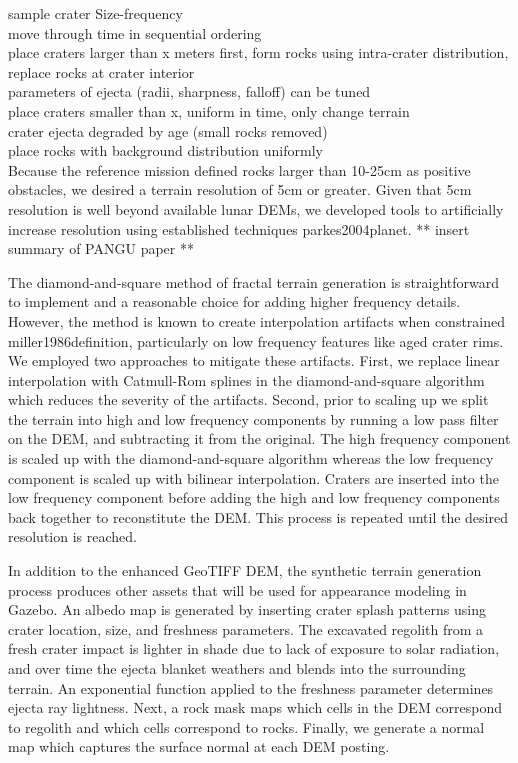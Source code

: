 \documentclass[twocolumn,letterpaper]{IEEEAerospaceCLS}  %
\begin{document}
sample crater Size-frequency \\
move through time in sequential ordering \\
place craters larger than x meters first, form rocks using intra-crater distribution, replace rocks at crater interior \\
parameters of ejecta (radii, sharpness, falloff) can be tuned \\
place craters smaller than x, uniform in time, only change terrain \\
crater ejecta degraded by age (small rocks removed) \\
place rocks with background distribution uniformly \\

Because the reference mission defined rocks larger than 10-25cm as positive obstacles, we desired a terrain resolution of 5cm or greater. Given that 5cm resolution is well beyond available lunar DEMs, we developed tools to artificially increase resolution using established techniques {parkes2004planet}. ** insert summary of PANGU paper **

The diamond-and-square method of fractal terrain generation is straightforward to implement and a reasonable choice for adding higher frequency details. However, the method is known to create interpolation artifacts when constrained {miller1986definition}, particularly on low frequency features like aged crater rims. We employed two approaches to mitigate these artifacts. First, we replace linear interpolation with Catmull-Rom splines in the diamond-and-square algorithm which reduces the severity of the artifacts. Second, prior to scaling up we split the terrain into high and low frequency components by running a low pass filter on the DEM, and subtracting it from the original. The high frequency component is scaled up with the diamond-and-square algorithm whereas the low frequency component is scaled up with bilinear interpolation. Craters are inserted into the low frequency component before adding the high and low frequency components back together to reconstitute the DEM. This process is repeated until the desired resolution is reached. 

In addition to the enhanced GeoTIFF DEM, the synthetic terrain generation process produces other assets that will be used for appearance modeling in Gazebo. An albedo map is generated by inserting crater splash patterns using crater location, size, and freshness parameters. The excavated regolith from a fresh crater impact is lighter in shade due to lack of exposure to solar radiation, and over time the ejecta blanket weathers and blends into the surrounding terrain. An exponential function applied to the freshness parameter determines ejecta ray lightness. Next, a rock mask maps which cells in the DEM correspond to regolith and which cells correspond to rocks. Finally, we generate a normal map which captures the surface normal at each DEM posting. 
\end{document}
